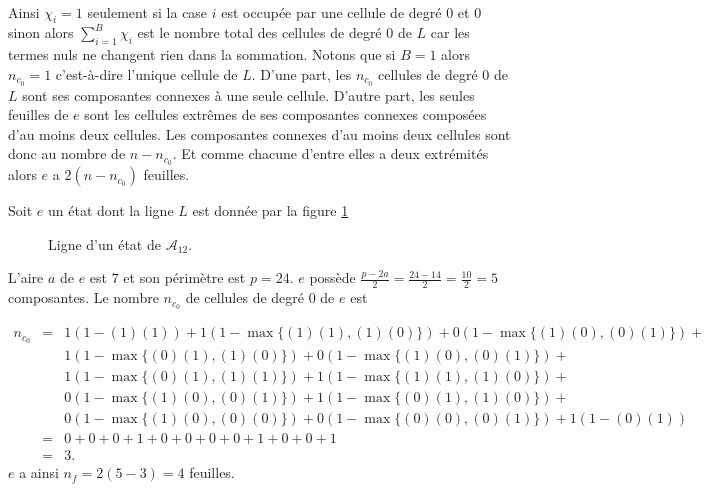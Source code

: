 \begin{Pre}
\begin{itemize}
\begin{eqnarray*}
 \end{eqnarray*}
\end{itemize}
Ainsi  $\chi_{i}=1$ seulement si la case $i$ est occupée par une cellule de degré $0$ et $0$ sinon alors $\displaystyle\sum_{i=1}^{B}\chi_{i}$ est le nombre total des cellules de degré $0$ de $L$ car les termes nuls ne changent rien dans la sommation. Notons que si $B=1$ alors $n_{c_{0}}=1$ c'est-à-dire l'unique cellule de $L$.
D'une part, les $n_{c_{0}}$ cellules de degré $0$ de $L$ sont ses composantes connexes à une seule cellule. D'autre part, les seules feuilles de $e$ sont les cellules extrêmes de  ses composantes connexes composées d'au moins deux cellules. Les composantes connexes d'au moins deux cellules sont donc au nombre de $n -n_{c_{0}}$. Et comme chacune d'entre elles a deux extrémités alors $e$ a $2(n-n_{c_{0}})$ feuilles.
\end{Pre}
\begin{Ex}\label{nf1}
Soit $e$ un état  dont la ligne $L$ est donnée par la figure \ref{figdec51}
\begin{figure}[!htb]
\begin{minipage}[c]{.04\linewidth}
        \centering
\end{minipage}
\hfill
\begin{minipage}[c]{.74\linewidth}
        \centering
\begin{logicpuzzle}[rows=1,columns=12,color=cyan!100, width=750px,scale=0.5]
\framepuzzle[black!50]
\end{logicpuzzle}
\end{minipage}
\caption{\label{figdec51} Ligne d'un état de $\mathcal{A}_{12}$.}
\end{figure}  
L'aire  $a$ de $e$ est $7$ et son  périmètre  est 
$p =24 $. $e$ possède $\frac{p-2a}{2}= \frac{24-14}{2}= \frac{10}{2}=5$ composantes. Le nombre $n_{c_{0}}$ de cellules de degré $0$  de $e$ est 

\begin{eqnarray*}
n_{c_{0}} & = & 1\left(1-(1)(1)\right)+ 1\left(1-\max\{(1)(1),(1)(0)\}\right) + 0\left(1-\max\{(1)(0),(0)(1)\}\right)+\\
& & 1\left(1-\max\{(0)(1),(1)(0)\}\right)+ 0\left(1-\max\{(1)(0),(0)(1)\}\right)+\\
& & 1\left(1-\max\{(0)(1),(1)(1)\}\right) + 1\left(1-\max\{(1)(1),(1)(0)\}\right)+\\
& & 0\left(1-\max\{(1)(0),(0)(1)\}\right)+1\left(1-\max\{(0)(1),(1)(0)\}\right)+\\
& & 0\left(1-\max\{(1)(0),(0)(0)\}\right)+ 0\left(1-\max\{(0)(0),(0)(1)\}\right) + 1(1-(0)(1))\\
&= & 0+0+0+1+0 +0+0+0+1+0+0+1\\
& = & 3.
\end{eqnarray*}
$e$ a ainsi $n_{f}= 2(5-3)= 4$ feuilles.
\end{Ex}
 
